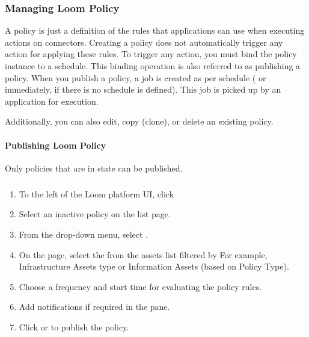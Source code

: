\documentclass[letterpaper,10pt,english]{sphinxmanual}
\begin{document}
\subsubsection{Managing Loom Policy}
\label{\detokenize{loom_getting_started_guide:managing-loom-policy}}
A policy is just a definition of the rules that applications can use when executing actions on connectors. Creating a policy does not automatically trigger any action for applying these rules. To trigger any action, you must bind the policy instance to a schedule. This binding operation is also referred to as publishing a policy. When you publish a policy, a job is created as per schedule ( or immediately, if there is no schedule is defined). This job is picked up by an application for execution.

Additionally, you can also edit, copy (clone), or delete an existing policy.


\paragraph{Publishing Loom Policy}
\label{\detokenize{loom_getting_started_guide:publishing-loom-policy}}
 Only policies that are in  state can be published.


\subparagraph{}
\label{\detokenize{loom_getting_started_guide:to-publish-a-policy}}\begin{enumerate}
\item {} 
To the left of the Loom platform UI, click 

\item {} 
Select an inactive policy on the  list page.

\item {} 
From the  drop-down menu, select .

\item {} 
On the  page, select the  from the assets list filtered by  For example, Infrastructure Assets type or Information Assets (based on Policy Type).

\item {} 
Choose a frequency and start time for evaluating the policy rules.

\item {} 
Add notifications if required in the  pane.

\item {} 
Click  or  to publish the policy.

\end{enumerate}
\end{document}
